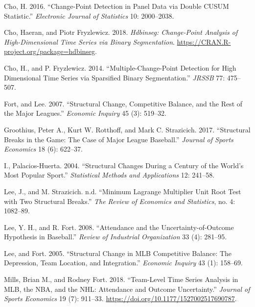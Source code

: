 \documentclass[
  12pt,
]{article}
\newlength{\cslhangindent}
\newlength{\cslentryspacingunit} %
\newenvironment{CSLReferences}[2] %
 {%
  \setlength{\parindent}{0pt}
  \ifodd #1
  \let\oldpar\par
  \def\par{\hangindent=\cslhangindent\oldpar}
  \fi
  \setlength{\parskip}{#2\cslentryspacingunit}
 }%
 {}
\begin{document}
\hypertarget{refs}{}
\begin{CSLReferences}{1}{0}
\leavevmode{}%
Cho, H. 2016. {``Change-Point Detection in Panel Data via Double CUSUM
Statistic.''} \emph{Electronic Journal of Statistics} 10: 2000--2038.

\leavevmode{}%
Cho, Haeran, and Piotr Fryzlewicz. 2018. \emph{Hdbinseg: Change-Point
Analysis of High-Dimensional Time Series via Binary Segmentation}.
\url{https://CRAN.R-project.org/package=hdbinseg}.

\leavevmode{}%
Cho, H., and P. Fryzlewicz. 2014. {``Multiple-Change-Point Detection for
High Dimensional Time Series via Sparsified Binary Segmentation.''}
\emph{JRSSB} 77: 475--507.

\leavevmode{}%
Fort, and Lee. 2007. {``Structural Change, Competitive Balance, and the
Rest of the Major Leagues.''} \emph{Economic Inquiry} 45 (3): 519--32.

\leavevmode{}%
Groothius, Peter A., Kurt W. Rotthoff, and Mark C. Strazicich. 2017.
{``Structural Breaks in the Game: The Case of Major League Baseball.''}
\emph{Journal of Sports Economics} 18 (6): 622--37.

\leavevmode{}%
I., Palacios-Huerta. 2004. {``Structural Changes During a Century of the
World's Most Popular Sport.''} \emph{Statistical Methods and
Applications} 12: 241--58.

\leavevmode{}%
Lee, J., and M. Strazicich. n.d. {``Minimum Lagrange Multiplier Unit
Root Test with Two Structural Breaks.''} \emph{The Review of Economics
and Statistics}, no. 4: 1082--89.

\leavevmode{}%
Lee, Y. H., and R. Fort. 2008. {``Attendance and the
Uncertainty-of-Outcome Hypothesis in Baseball.''} \emph{Review of
Industrial Organization} 33 (4): 281--95.

\leavevmode{}%
Lee, and Fort. 2005. {``Structural Change in MLB Competitive Balance:
The Depression, Team Location, and Integration.''} \emph{Economic
Inquiry} 43 (1): 158--69.

\leavevmode{}%
Mills, Brian M., and Rodney Fort. 2018. {``Team-Level Time Series
Analysis in MLB, the NBA, and the NHL: Attendance and Outcome
Uncertainty.''} \emph{Journal of Sports Economics} 19 (7): 911--33.
\url{https://doi.org/10.1177/1527002517690787}.


\end{CSLReferences}
\end{document}
